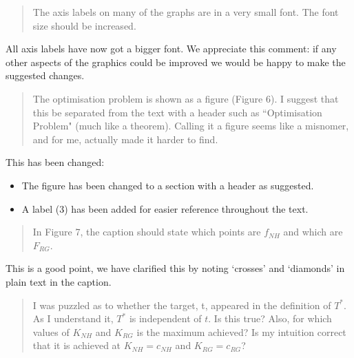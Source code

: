\documentclass{article}
\begin{document}
\begin{quote}
    \begin{textit}
        {
        The axis labels on many of the graphs are in a very small font. The
        font size should be increased.
        }
    \end{textit}
\end{quote}

All axis labels have now got a bigger font. We appreciate this comment: if any
other aspects of the graphics could be improved we would be happy to make the
suggested changes.

\begin{quote}
    \begin{textit}
        {
        The optimisation problem is shown as a figure (Figure 6). I suggest
        that this be separated from the text with a header such as
        ``Optimisation Problem" (much like a theorem).  Calling it a figure
        seems like a misnomer, and for me, actually made it harder to find.
        }
    \end{textit}
\end{quote}

This has been changed:

\begin{itemize}
    \item The figure has been changed to a section with a header as suggested.
    \item A label (3) has been added for easier reference throughout the text.
\end{itemize}

\begin{quote}
    \begin{textit}
        {
            In Figure 7, the caption should state which points are \(f_{NH}\) and
            which are \(F_{RG}\).
        }
    \end{textit}
\end{quote}

This is a good point, we have clarified this by noting `crosses' and `diamonds' in plain text in the caption.

\begin{quote}
    \begin{textit}
        {
I was puzzled as to whether the target, t, appeared in the definition
of \(T^*\). As I understand it, \(T^*\) is independent of \(t\). Is this true?
Also, for which values of \(K_{NH}\) and \(K_{RG}\) is the maximum achieved? Is my
intuition correct that it is achieved at \(K_{NH} = c_{NH}\) and \(K_{RG} = c_{RG}\)?
        }
    \end{textit}
\end{quote}
\end{document}
